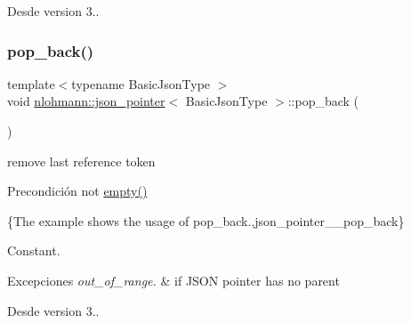 \begin{DoxySince}{Desde}
version 3.. 
\end{DoxySince}
\mbox{\label{classnlohmann_1_1json__pointer_a4b1ee4d511ca195bed896a3da47e264c}} 
\subsubsection{\texorpdfstring{pop\+\_\+back()}{pop\_back()}}
{\footnotesize\ttfamily template$<$typename Basic\+Json\+Type $>$ \\
void \mbox{\hyperlink{classnlohmann_1_1json__pointer}{nlohmann\+::json\+\_\+pointer}}$<$ Basic\+Json\+Type $>$\+::pop\+\_\+back (\begin{DoxyParamCaption}{ }\end{DoxyParamCaption})\hspace{0.3cm}{\ttfamily [inline]}}



remove last reference token 

\begin{DoxyPrecond}{Precondición}
not {\ttfamily \mbox{\hyperlink{classnlohmann_1_1json__pointer_a649252bda4a2e75a0915b11a25d8bcc3}{empty()}}}
\end{DoxyPrecond}
\{The example shows the usage of {\ttfamily pop\+\_\+back}.,json\+\_\+pointer\+\_\+\+\_\+pop\+\_\+back\}

Constant.


\begin{DoxyExceptions}{Excepciones}
{\em out\+\_\+of\+\_\+range.} & if J\+S\+ON pointer has no parent\\
\hline
\end{DoxyExceptions}
\begin{DoxySince}{Desde}
version 3.. 
\end{DoxySince}
\mbox{\label{classnlohmann_1_1json__pointer_a697d12b5bd6205f8866691b166b7c7dc}} 

